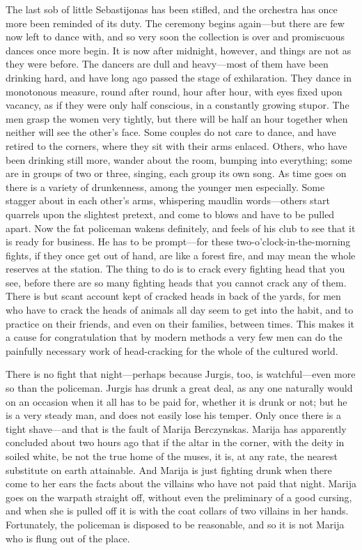 \documentclass[
]{book}
\theoremstyle{definition}
\theoremstyle{definition}
\theoremstyle{definition}
\theoremstyle{definition}
\theoremstyle{remark}
\begin{document}
The last sob of little Sebastijonas has been stifled, and the orchestra has once more been reminded of its duty. The ceremony begins again---but there are few now left to dance with, and so very soon the collection is over and promiscuous dances once more begin. It is now after midnight, however, and things are not as they were before. The dancers are dull and heavy---most of them have been drinking hard, and have long ago passed the stage of exhilaration. They dance in monotonous measure, round after round, hour after hour, with eyes fixed upon vacancy, as if they were only half conscious, in a constantly growing stupor. The men grasp the women very tightly, but there will be half an hour together when neither will see the other's face. Some couples do not care to dance, and have retired to the corners, where they sit with their arms enlaced. Others, who have been drinking still more, wander about the room, bumping into everything; some are in groups of two or three, singing, each group its own song. As time goes on there is a variety of drunkenness, among the younger men especially. Some stagger about in each other's arms, whispering maudlin words---others start quarrels upon the slightest pretext, and come to blows and have to be pulled apart. Now the fat policeman wakens definitely, and feels of his club to see that it is ready for business. He has to be prompt---for these two-o'clock-in-the-morning fights, if they once get out of hand, are like a forest fire, and may mean the whole reserves at the station. The thing to do is to crack every fighting head that you see, before there are so many fighting heads that you cannot crack any of them. There is but scant account kept of cracked heads in back of the yards, for men who have to crack the heads of animals all day seem to get into the habit, and to practice on their friends, and even on their families, between times. This makes it a cause for congratulation that by modern methods a very few men can do the painfully necessary work of head-cracking for the whole of the cultured world.

There is no fight that night---perhaps because Jurgis, too, is watchful---even more so than the policeman. Jurgis has drunk a great deal, as any one naturally would on an occasion when it all has to be paid for, whether it is drunk or not; but he is a very steady man, and does not easily lose his temper. Only once there is a tight shave---and that is the fault of Marija Berczynskas. Marija has apparently concluded about two hours ago that if the altar in the corner, with the deity in soiled white, be not the true home of the muses, it is, at any rate, the nearest substitute on earth attainable. And Marija is just fighting drunk when there come to her ears the facts about the villains who have not paid that night. Marija goes on the warpath straight off, without even the preliminary of a good cursing, and when she is pulled off it is with the coat collars of two villains in her hands. Fortunately, the policeman is disposed to be reasonable, and so it is not Marija who is flung out of the place.
\end{document}
